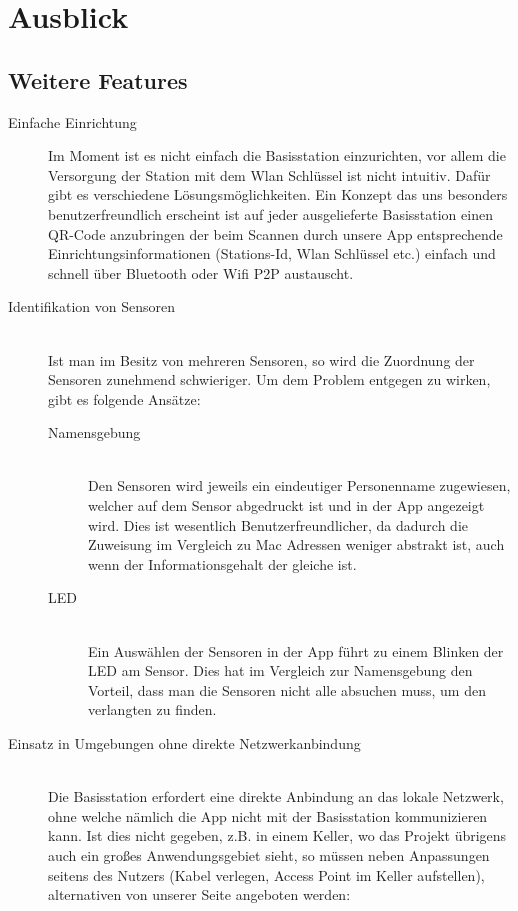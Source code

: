 \section{Ausblick}
\subsection{Weitere Features}
\begin{description}
	\item[Einfache Einrichtung] Im Moment ist es nicht einfach die Basisstation einzurichten, vor allem die Versorgung der Station mit dem Wlan Schlüssel ist nicht intuitiv. Dafür gibt es verschiedene Lösungsmöglichkeiten. Ein Konzept das uns besonders benutzerfreundlich erscheint ist auf jeder ausgelieferte Basisstation einen QR-Code anzubringen der beim Scannen durch unsere App entsprechende Einrichtungsinformationen (Stations-Id, Wlan Schlüssel etc.) einfach und schnell über Bluetooth oder Wifi P2P austauscht.
	\item [Identifikation von Sensoren] \hfill \\
		Ist man im Besitz von mehreren Sensoren, so wird die Zuordnung der Sensoren zunehmend schwieriger. Um dem Problem entgegen zu wirken, gibt es folgende Ansätze:
		\begin{description}
			\item [Namensgebung] \hfill \\
				Den Sensoren wird jeweils ein eindeutiger Personenname zugewiesen, welcher auf dem Sensor abgedruckt ist und in der App angezeigt wird. Dies ist wesentlich Benutzerfreundlicher, da dadurch die Zuweisung im Vergleich zu Mac Adressen weniger abstrakt ist, auch wenn der Informationsgehalt der gleiche ist.
			\item [LED] \hfill \\
				Ein Auswählen der Sensoren in der App führt zu einem Blinken der LED am Sensor. Dies hat im Vergleich zur Namensgebung den Vorteil, dass man die Sensoren nicht alle absuchen muss, um den verlangten zu finden.
		\end{description}
	\item [Einsatz in Umgebungen ohne direkte Netzwerkanbindung] \hfill \\
		Die Basisstation erfordert eine direkte Anbindung an das lokale Netzwerk, ohne welche nämlich die App nicht mit der Basisstation kommunizieren kann. Ist dies nicht gegeben, z.B. in einem Keller, wo das Projekt übrigens auch ein großes Anwendungsgebiet sieht, so müssen neben Anpassungen seitens des Nutzers (Kabel verlegen, Access Point im Keller aufstellen), alternativen von unserer Seite angeboten werden:

\end{description}
